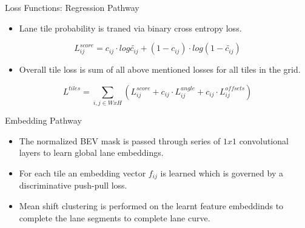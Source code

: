 \documentclass[aspectratio=169]{beamer}
\begin{document}
\begin{frame}{Loss Functions: Regression Pathway}
    \begin{itemize}
        \item Lane tile probability is traned via binary cross entropy loss.
    \end{itemize}
    \begin{equation}
                 L_{ij}^{score} = c_{ij} \cdot log \widetilde{c_{ij}} + (1 - c_{ij}) \cdot log
                    (1-  \widetilde{c_{ij}})
             \end{equation}

    \begin{itemize}
        \item Overall tile loss is sum of all above mentioned losses for all tiles in the grid.
    \end{itemize}

     \begin{equation}
                L^{tiles} = \sum_{i,j \in WxH}(L^{score}_{ij} +c_{ij} \cdot L^{angle}_{ij} + c_{ij} \cdot L^{offsets}_{ij}  )
            \end{equation}
    
\end{frame}

\begin{frame}{Embedding Pathway}
\begin{itemize}
    \item The normalized BEV mask is passed through series of $1x1$ convolutional layers to learn global lane embeddings.
    \item For each tile an embedding vector $f_{ij}$ is learned which is governed by a discriminative push-pull loss.
    \item Mean shift clustering is performed on the learnt feature embeddinds to complete the lane segments to complete lane curve.
\end{itemize}
\end{frame}
\end{document}
